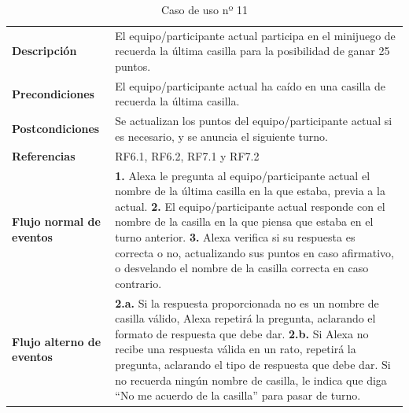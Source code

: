 \begin{table}[H]
	\centering
	\begin{tabular}{|p{3cm}|p{12cm}|}
		\hline
		\rowcolor{lightgray}
		\multicolumn{2}{|c|}{\textbf{CU11}: Minijuego recuerda la última casilla} \\
		\hline
		\textbf{Descripción} & El equipo/participante actual participa en el minijuego de recuerda la última casilla para la posibilidad de ganar 25 puntos. \vspace{0.2cm} \\
		\hline
		\textbf{Precondiciones} & El equipo/participante actual ha caído en una casilla de recuerda la última casilla. \vspace{0.2cm} \\
		\hline
		\textbf{Postcondiciones} & Se actualizan los puntos del equipo/participante actual si es necesario, y se anuncia el siguiente turno. \vspace{0.2cm} \\
		\hline
		\textbf{Referencias} & RF6.1, RF6.2, RF7.1 y RF7.2 \vspace{0.2cm} \\
		\hline
		\textbf{Flujo normal de eventos} &
		\textbf{1.} Alexa le pregunta al equipo/participante actual el nombre de la última casilla en la que estaba, previa a la actual. \newline
		\vspace{0.2cm}
		\textbf{2.} El equipo/participante actual responde con el nombre de la casilla en la que piensa que estaba en el turno anterior. \newline
		\vspace{0.2cm}
		\textbf{3.} Alexa verifica si su respuesta es correcta o no, actualizando sus puntos en caso afirmativo, o desvelando el nombre de la casilla correcta en caso contrario.
		\vspace{0.2cm} \\
		\hline
		\textbf{Flujo alterno de eventos} &
		\textbf{2.a.} Si la respuesta proporcionada no es un nombre de casilla válido, Alexa repetirá la pregunta, aclarando el formato de respuesta que debe dar. \newline
		\vspace{0.2cm} 
		\textbf{2.b.} Si Alexa no recibe una respuesta válida en un rato, repetirá la pregunta, aclarando el tipo de respuesta que debe dar. Si no recuerda ningún nombre de casilla, le indica que diga \enquote{No me acuerdo de la casilla} para pasar de turno.
		\vspace{0.2cm} \\
		\hline
	\end{tabular}
	\caption{Caso de uso nº 11}
	\label{tab:CU11}
\end{table}

